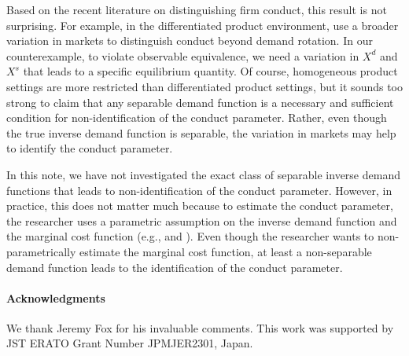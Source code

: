 \documentclass[11pt, a4paper]{article}
\theoremstyle{remark}
\begin{document}
Based on the recent literature on distinguishing firm conduct, this result is not surprising.
For example, in the differentiated product environment, \citet{berry2014identification}  use a broader variation in markets to distinguish conduct beyond demand rotation.
In our counterexample, to violate observable equivalence, we need a variation in $X^{d}$ and $X^{s}$ that leads to a specific equilibrium quantity.
Of course, homogeneous product settings are more restricted than differentiated product settings, but it sounds too strong to claim that any separable demand function is a necessary and sufficient condition for non-identification of the conduct parameter.
Rather, even though the true inverse demand function is separable, the variation in markets may help to identify the conduct parameter.

In this note, we have not investigated the exact class of separable inverse demand functions that leads to non-identification of the conduct parameter.
However, in practice, this does not matter much because to estimate the conduct parameter, the researcher uses a parametric assumption on the inverse demand function and the marginal cost function (e.g., \citet{okazaki2022excess} and \citet{matsumura2024loglinear}).
Even though the researcher wants to non-parametrically estimate the marginal cost function, at least a non-separable demand function leads to the identification of the conduct parameter.

\paragraph{Acknowledgments}
We thank Jeremy Fox for his invaluable comments.
This work was supported by JST ERATO Grant Number JPMJER2301, Japan.  


\newpage







\appendix
\end{document}
